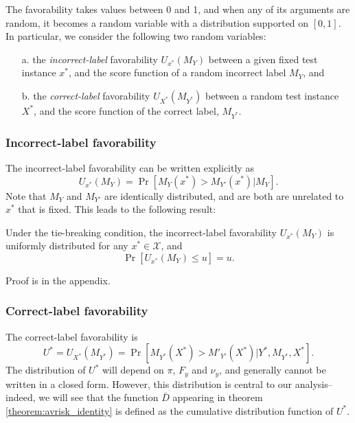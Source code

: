 \documentclass[twoside,11pt]{article}
\begin{document}
The favorability takes values between 0 and 1, and when any of its arguments are random, it becomes a random variable with a distribution supported on $[0,1]$.
In particular, we consider the following two random variables:
\begin{itemize}
\item[a.] the \emph{incorrect-label} favorability $U_{x^*}(M_Y)$ between a given fixed test instance $x^*$, and the score function of a random incorrect label $M_{Y}$, and
\item[b.] the \emph{correct-label} favorability $U_{X^*}(M_{Y^*})$ between a random test instance $X^*$, and the score function of the correct label, $M_{Y^*}$.
\end{itemize}
\subsubsection{Incorrect-label favorability}
The incorrect-label favorability can be written explicitly as 
\begin{equation}
U_{x^*}(M_Y) = \Pr[M_{Y}(x^*) > M_{Y'}(x^*)|M_{Y}].
\end{equation}
Note that $M_Y$ and $M_{Y'}$ are identically distributed, and are both are unrelated to $x^*$ that is fixed. This leads to the following result: 
\begin{lemma}\label{lemma:U_function}
Under the tie-breaking condition, the incorrect-label favorability $U_{x^*}(M_Y)$ is uniformly distributed for any $x^* \in \mathcal{X}$, and \begin{equation}\label{eq:Uniform}
\Pr[U_{x^*}(M_Y) \leq u] = u.
\end{equation}
\end{lemma}
Proof is in the appendix. 

\subsubsection{Correct-label favorability}

The correct-label favorability is 
\begin{equation}
U^* = U_{X^*}(M_{Y^*}) = \Pr[M_{Y^*}(X^*) > M'_{Y'}(X^*)|Y^*,M_{Y^*},X^*].
\end{equation}
The distribution of $U^*$ will depend on $\pi$, $F_y$ and $\nu_y$,
and generally cannot be written in a closed form.  
However, this distribution is central to our analysis--indeed, we will see that the function $\bar{D}$ appearing in theorem \ref{theorem:avrisk_identity} is defined as the cumulative distribution function of $U^*$.
\end{document}
